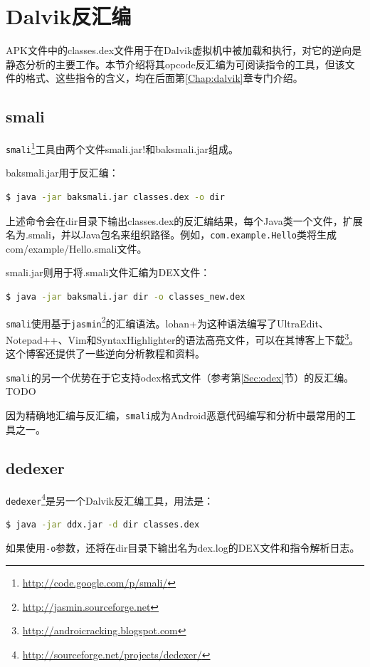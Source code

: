 \section{Dalvik反汇编}
APK文件中的classes.dex文件用于在Dalvik虚拟机中被加载和执行，对它的逆向是静态分析的主要工作。本节介绍将其opcode反汇编为可阅读指令的工具，但该文件的格式、这些指令的含义，均在后面第\ref{Chap:dalvik}章专门介绍。

\subsection{smali}
\lstinline!smali!\footnote{\url{http://code.google.com/p/smali/}}工具由两个文件smali.jar!和baksmali.jar组成。

baksmali.jar用于反汇编：
\begin{lstlisting}[language=bash, numbers=none]
 $ java -jar baksmali.jar classes.dex -o dir
\end{lstlisting}
上述命令会在dir目录下输出classes.dex的反汇编结果，每个Java类一个文件，扩展名为.smali，并以Java包名来组织路径。例如，\lstinline!com.example.Hello!类将生成com/example/Hello.smali文件。

smali.jar则用于将.smali文件汇编为DEX文件：
\begin{lstlisting}[language=bash, numbers=none]
 $ java -jar baksmali.jar dir -o classes_new.dex
\end{lstlisting}

\lstinline!smali!使用基于\lstinline!jasmin!\footnote{\url{http://jasmin.sourceforge.net}}的汇编语法。lohan+为这种语法编写了UltraEdit、Notepad++、Vim和SyntaxHighlighter的语法高亮文件，可以在其博客上下载\footnote{\url{http://androicracking.blogspot.com}}。这个博客还提供了一些逆向分析教程和资料。

\lstinline!smali!的另一个优势在于它支持odex格式文件（参考第\ref{Sec:odex}节）的反汇编。TODO

因为精确地汇编与反汇编，\lstinline!smali!成为Android恶意代码编写和分析中最常用的工具之一。

\subsection{dedexer}
\lstinline!dedexer!\footnote{\url{http://sourceforge.net/projects/dedexer/}}是另一个Dalvik反汇编工具，用法是：
\begin{lstlisting}[language=bash, numbers=none]
 $ java -jar ddx.jar -d dir classes.dex
\end{lstlisting}
如果使用\lstinline!-o!参数，还将在dir目录下输出名为dex.log的DEX文件和指令解析日志。

